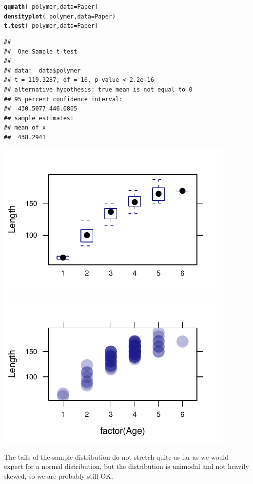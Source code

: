\documentclass[twoside]{book}\usepackage[]{graphicx}\usepackage[]{xcolor}
\makeatletter
\def\maxwidth{ %
  \ifdim\Gin@nat@width>\linewidth
    \linewidth
  \else
    \Gin@nat@width
  \fi
}
\newcommand{\hlopt}[1]{\textcolor[rgb]{0,0,0}{#1}}%
\newcommand{\hlstd}[1]{\textcolor[rgb]{0.345,0.345,0.345}{#1}}%
\newcommand{\hlkwc}[1]{\textcolor[rgb]{0.333,0.667,0.333}{#1}}%
\newcommand{\hlkwd}[1]{\textcolor[rgb]{0.737,0.353,0.396}{\textbf{#1}}}%
\newenvironment{kframe}{%
 \def\at@end@of@kframe{}%
 \ifinner\ifhmode%
  \def\at@end@of@kframe{\end{minipage}}%
  \begin{minipage}{\columnwidth}%
 \fi\fi%
 \def\FrameCommand##1{\hskip\@totalleftmargin \hskip-\fboxsep
 \colorbox{shadecolor}{##1}\hskip-\fboxsep
     \hskip-\linewidth \hskip-\@totalleftmargin \hskip\columnwidth}%
 \MakeFramed {\advance\hsize-\width
   \@totalleftmargin\z@ \linewidth\hsize
   \@setminipage}}%
 {\par\unskip\endMakeFramed%
 \at@end@of@kframe}
\newenvironment{knitrout}{}{} %
\makeatother
\begin{document}
\begin{solution}
\begin{knitrout}
\color{fgcolor}\begin{kframe}
\begin{alltt}
\hlkwd{qqmath}\hlstd{(}\hlopt{~}\hlstd{polymer,} \hlkwc{data} \hlstd{= Paper)}
\hlkwd{densityplot}\hlstd{(}\hlopt{~}\hlstd{polymer,} \hlkwc{data} \hlstd{= Paper)}
\hlkwd{t.test}\hlstd{(}\hlopt{~}\hlstd{polymer,} \hlkwc{data} \hlstd{= Paper)}
\end{alltt}
\begin{verbatim}
## 
## 	One Sample t-test
## 
## data:  data$polymer
## t = 119.3287, df = 16, p-value < 2.2e-16
## alternative hypothesis: true mean is not equal to 0
## 95 percent confidence interval:
##  430.5077 446.0805
## sample estimates:
## mean of x 
##  438.2941
\end{verbatim}
\end{kframe}

{\centering \includegraphics[width=\maxwidth]{figures/fig-unnamed-chunk-154-1} 
\includegraphics[width=\maxwidth]{figures/fig-unnamed-chunk-154-2} 

}



\end{knitrout}
The tails of the sample distribution do not stretch quite as far as we would expect 
for a normal distribution, but the distribution is unimodal and not heavily skewed,
so we are probably still OK.
\end{solution}
\end{document}
